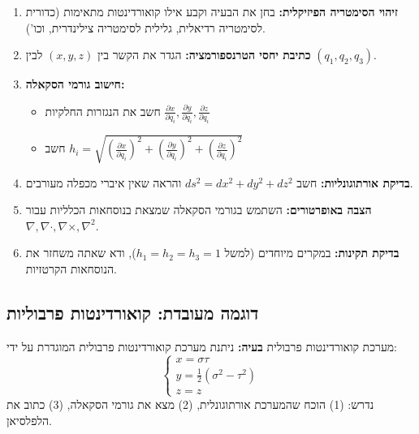 \documentclass{article}
\newenvironment{steps}
  {\begin{enumerate}[label=שלב \arabic*:, rightmargin=1cm]}
  {\end{enumerate}}
\begin{document}
\begin{steps}
\item \textbf{זיהוי הסימטריה הפיזיקלית:} בחן את הבעיה וקבע אילו קואורדינטות מתאימות (כדורית לסימטריה רדיאלית, גלילית לסימטריה צילינדרית, וכו').

\item \textbf{כתיבת יחסי הטרנספורמציה:} הגדר את הקשר בין $(x,y,z)$ לבין $(q_1, q_2, q_3)$.

\item \textbf{חישוב גורמי הסקאלה:}
\begin{itemize}
\item חשב את הנגזרות החלקיות $\frac{\partial x}{\partial q_i}, \frac{\partial y}{\partial q_i}, \frac{\partial z}{\partial q_i}$
\item חשב $h_i = \sqrt{\left(\frac{\partial x}{\partial q_i}\right)^2 + \left(\frac{\partial y}{\partial q_i}\right)^2 + \left(\frac{\partial z}{\partial q_i}\right)^2}$
\end{itemize}

\item \textbf{בדיקת אורתוגונליות:} חשב $ds^2 = dx^2 + dy^2 + dz^2$ והראה שאין איברי מכפלה מעורבים.

\item \textbf{הצבה באופרטורים:} השתמש בגורמי הסקאלה שמצאת בנוסחאות הכלליות עבור $\nabla, \nabla\cdot, \nabla\times, \nabla^2$.

\item \textbf{בדיקת תקינות:} במקרים מיוחדים (למשל $h_1=h_2=h_3=1$), ודא שאתה משחזר את הנוסחאות הקרטזיות.
\end{steps}

\subsection*{דוגמה מעובדת: קואורדינטות פרבוליות}

\begin{examplebox}{מערכת קואורדינטות פרבולית}
\textbf{בעיה:} ניתנת מערכת קואורדינטות פרבולית המוגדרת על ידי:
\[
\begin{cases}
x = \sigma\tau \\
y = \frac{1}{2}(\sigma^2 - \tau^2) \\
z = z
\end{cases}
\]
נדרש: (1) הוכח שהמערכת אורתוגונלית, (2) מצא את גורמי הסקאלה, (3) כתוב את הלפלסיאן.
\end{examplebox}
\end{document}
